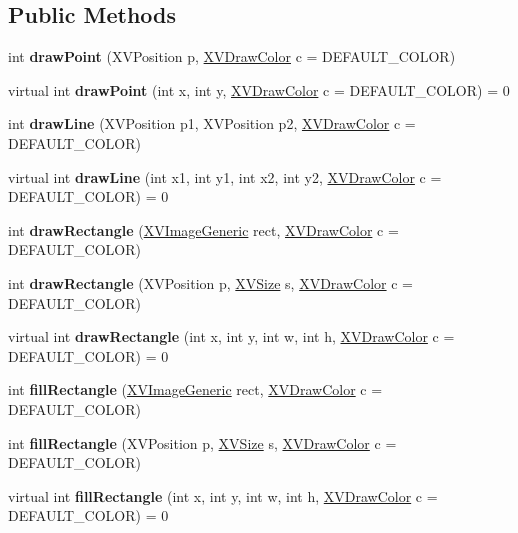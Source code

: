 \subsection*{Public Methods}
\begin{CompactItemize}
\item 
int {\bf draw\-Point} (XVPosition p, \hyperlink{class_XVDrawColor}{XVDraw\-Color} c = DEFAULT\_\-COLOR)
\item 
\label{XVDrawable_a1}
\hypertarget{class_XVDrawable_a1}{
virtual int {\bf draw\-Point} (int x, int y, \hyperlink{class_XVDrawColor}{XVDraw\-Color} c = DEFAULT\_\-COLOR) = 0}

\item 
int {\bf draw\-Line} (XVPosition p1, XVPosition p2, \hyperlink{class_XVDrawColor}{XVDraw\-Color} c = DEFAULT\_\-COLOR)
\item 
\label{XVDrawable_a3}
\hypertarget{class_XVDrawable_a3}{
virtual int {\bf draw\-Line} (int x1, int y1, int x2, int y2, \hyperlink{class_XVDrawColor}{XVDraw\-Color} c = DEFAULT\_\-COLOR) = 0}

\item 
int {\bf draw\-Rectangle} (\hyperlink{class_XVImageGeneric}{XVImage\-Generic} rect, \hyperlink{class_XVDrawColor}{XVDraw\-Color} c = DEFAULT\_\-COLOR)
\item 
int {\bf draw\-Rectangle} (XVPosition p, \hyperlink{class_XVSize}{XVSize} s, \hyperlink{class_XVDrawColor}{XVDraw\-Color} c = DEFAULT\_\-COLOR)
\item 
\label{XVDrawable_a6}
\hypertarget{class_XVDrawable_a6}{
virtual int {\bf draw\-Rectangle} (int x, int y, int w, int h, \hyperlink{class_XVDrawColor}{XVDraw\-Color} c = DEFAULT\_\-COLOR) = 0}

\item 
int {\bf fill\-Rectangle} (\hyperlink{class_XVImageGeneric}{XVImage\-Generic} rect, \hyperlink{class_XVDrawColor}{XVDraw\-Color} c = DEFAULT\_\-COLOR)
\item 
int {\bf fill\-Rectangle} (XVPosition p, \hyperlink{class_XVSize}{XVSize} s, \hyperlink{class_XVDrawColor}{XVDraw\-Color} c = DEFAULT\_\-COLOR)
\item 
\label{XVDrawable_a9}
\hypertarget{class_XVDrawable_a9}{
virtual int {\bf fill\-Rectangle} (int x, int y, int w, int h, \hyperlink{class_XVDrawColor}{XVDraw\-Color} c = DEFAULT\_\-COLOR) = 0}


\end{CompactItemize}
